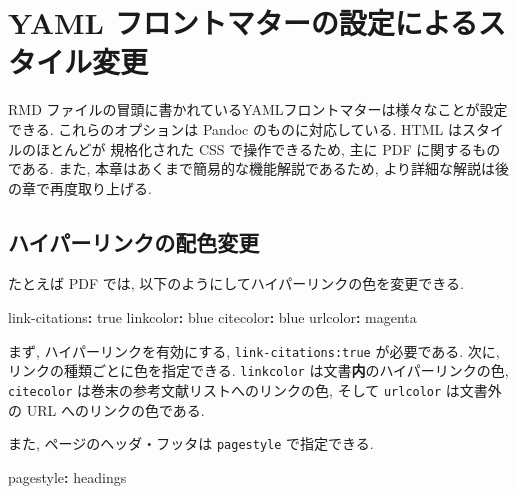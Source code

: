 \documentclass[
  xelatex,ja=standard,jafont=noto]{bxjsbook}
\newenvironment{Shaded}{\begin{snugshade}}{\end{snugshade}}
\newcommand{\AttributeTok}[1]{\textcolor[rgb]{0.77,0.63,0.00}{#1}}
\newcommand{\CharTok}[1]{\textcolor[rgb]{0.31,0.60,0.02}{#1}}
\newcommand{\FunctionTok}[1]{\textcolor[rgb]{0.00,0.00,0.00}{#1}}
\newcommand{\KeywordTok}[1]{\textcolor[rgb]{0.13,0.29,0.53}{\textbf{#1}}}
\theoremstyle{definition}
\theoremstyle{definition}
\theoremstyle{definition}
\theoremstyle{definition}
\theoremstyle{remark}
\begin{document}
\hypertarget{yaml-ux30d5ux30edux30f3ux30c8ux30deux30bfux30fcux306eux8a2dux5b9aux306bux3088ux308bux30b9ux30bfux30a4ux30ebux5909ux66f4}{%
\section{YAML
フロントマターの設定によるスタイル変更}\label{yaml-ux30d5ux30edux30f3ux30c8ux30deux30bfux30fcux306eux8a2dux5b9aux306bux3088ux308bux30b9ux30bfux30a4ux30ebux5909ux66f4}}

RMD
ファイルの冒頭に書かれているYAMLフロントマターは様々なことが設定できる.
これらのオプションは Pandoc のものに対応している. HTML
はスタイルのほとんどが 規格化された CSS で操作できるため, 主に PDF
に関するものである. また, 本章はあくまで簡易的な機能解説であるため,
より詳細な解説は後の章で再度取り上げる.

\hypertarget{ux30cfux30a4ux30d1ux30fcux30eaux30f3ux30afux306eux914dux8272ux5909ux66f4}{%
\subsection{ハイパーリンクの配色変更}\label{ux30cfux30a4ux30d1ux30fcux30eaux30f3ux30afux306eux914dux8272ux5909ux66f4}}

たとえば PDF では, 以下のようにしてハイパーリンクの色を変更できる.

\begin{Shaded}
\begin{Highlighting}[]
\FunctionTok{link{-}citations}\KeywordTok{:}\AttributeTok{ }\CharTok{true}
\FunctionTok{linkcolor}\KeywordTok{:}\AttributeTok{ blue}
\FunctionTok{citecolor}\KeywordTok{:}\AttributeTok{ blue}
\FunctionTok{urlcolor}\KeywordTok{:}\AttributeTok{ magenta}
\end{Highlighting}
\end{Shaded}

まず, ハイパーリンクを有効にする, \texttt{link-citations:true}
が必要である. 次に, リンクの種類ごとに色を指定できる. \texttt{linkcolor}
は文書\textbf{内}のハイパーリンクの色, \texttt{citecolor}
は巻末の参考文献リストへのリンクの色, そして \texttt{urlcolor}
は文書外の URL へのリンクの色である.

また, ページのヘッダ・フッタは \texttt{pagestyle} で指定できる.

\begin{Shaded}
\begin{Highlighting}[]
\FunctionTok{pagestyle}\KeywordTok{:}\AttributeTok{ headings}
\end{Highlighting}
\end{Shaded}
\end{document}
